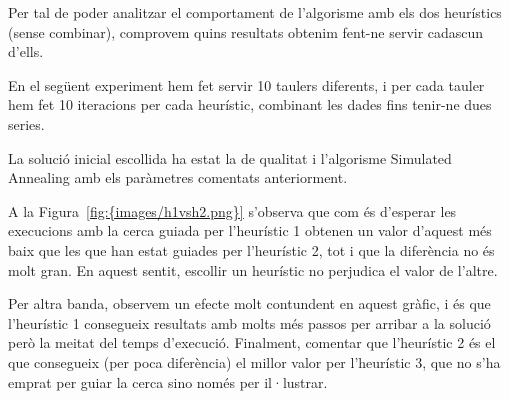 Per tal de poder analitzar el comportament de l'algorisme amb els dos heurístics (sense combinar), comprovem quins resultats obtenim fent-ne servir cadascun d'ells.

En el següent experiment hem fet servir 10 taulers diferents, i per cada tauler hem fet 10 iteracions per cada heurístic, combinant les dades fins tenir-ne dues series.

La solució inicial escollida ha estat la de qualitat i l'algorisme Simulated Annealing amb els paràmetres comentats anteriorment.



A la Figura~\ref{fig:{images/h1vsh2.png}} s'observa que com és d'esperar les execucions amb la cerca guiada per l'heurístic 1 obtenen un valor d'aquest més baix que les que han estat guiades per l'heurístic 2, tot i que la diferència no és molt gran. En aquest sentit, escollir un heurístic no perjudica el valor de l'altre.

Per altra banda, observem un efecte molt contundent en aquest gràfic, i és que l'heurístic 1 consegueix resultats amb molts més passos per arribar a la solució però la meitat del temps d'execució. Finalment, comentar que l'heurístic 2 és el que consegueix (per poca diferència) el millor valor per l'heurístic 3, que no s'ha emprat per guiar la cerca sino només per il·lustrar.

